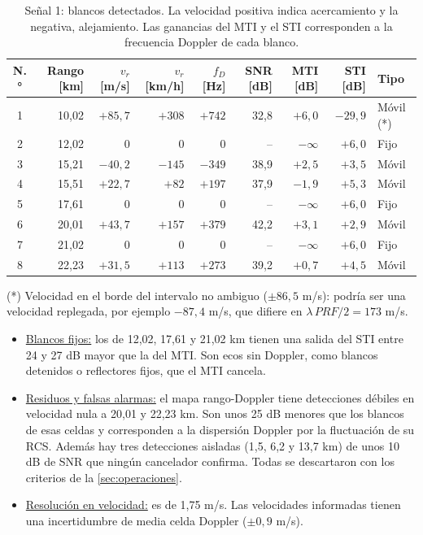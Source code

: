 \begin{table}[H]
    \centering
    \footnotesize
    \caption{Señal 1: blancos detectados. La velocidad positiva indica acercamiento y la negativa, alejamiento. Las ganancias del MTI y el STI corresponden a la frecuencia Doppler de cada blanco.}
    \label{tab:blancos}
    \begin{tabular}{|c|r|r|r|r|r|r|r|l|}
        \hline
        \textbf{N.°} & \textbf{Rango [km]} & \textbf{$v_r$ [m/s]} & \textbf{$v_r$ [km/h]} & \textbf{$f_D$ [Hz]} & \textbf{SNR [dB]} & \textbf{MTI [dB]} & \textbf{STI [dB]} & \textbf{Tipo} \\
        \hline
        1 & 10,02 & $+85{,}7$ & $+308$ & $+742$ & 32,8 & $+6{,}0$ & $-29{,}9$ & Móvil (*) \\
        2 & 12,02 & 0 & 0 & 0 & -- & $-\infty$ & $+6{,}0$ & Fijo \\
        3 & 15,21 & $-40{,}2$ & $-145$ & $-349$ & 38,9 & $+2{,}5$ & $+3{,}5$ & Móvil \\
        4 & 15,51 & $+22{,}7$ & $+82$ & $+197$ & 37,9 & $-1{,}9$ & $+5{,}3$ & Móvil \\
        5 & 17,61 & 0 & 0 & 0 & -- & $-\infty$ & $+6{,}0$ & Fijo \\
        6 & 20,01 & $+43{,}7$ & $+157$ & $+379$ & 42,2 & $+3{,}1$ & $+2{,}9$ & Móvil \\
        7 & 21,02 & 0 & 0 & 0 & -- & $-\infty$ & $+6{,}0$ & Fijo \\
        8 & 22,23 & $+31{,}5$ & $+113$ & $+273$ & 39,2 & $+0{,}7$ & $+4{,}5$ & Móvil \\
        \hline
    \end{tabular}

    \vspace{0.1cm}
    \raggedright \scriptsize (*) Velocidad en el borde del intervalo no ambiguo ($\pm 86{,}5$ m/s): podría ser una velocidad replegada, por ejemplo $-87{,}4$ m/s, que difiere en $\lambda \, PRF/2 = 173$ m/s.
\end{table}

\begin{itemize}
    \item \underline{Blancos fijos:} los de 12,02, 17,61 y 21,02 km tienen una salida del STI entre 24 y 27 dB mayor que la del MTI. Son ecos sin Doppler, como blancos detenidos o reflectores fijos, que el MTI cancela.
    \item \underline{Residuos y falsas alarmas:} el mapa rango-Doppler tiene detecciones débiles en velocidad nula a 20,01 y 22,23 km. Son unos 25 dB menores que los blancos de esas celdas y corresponden a la dispersión Doppler por la fluctuación de su RCS. Además hay tres detecciones aisladas (1,5, 6,2 y 13,7 km) de unos 10 dB de SNR que ningún cancelador confirma. Todas se descartaron con los criterios de la \autoref{sec:operaciones}.
    \item \underline{Resolución en velocidad:} es de 1,75 m/s. Las velocidades informadas tienen una incertidumbre de media celda Doppler ($\pm 0{,}9$ m/s).
\end{itemize}
